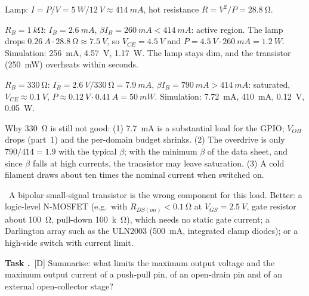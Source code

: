 \documentclass[a4paper,11pt]{article}
\newcounter{task}[section]
\renewcommand{\thetask}{\thesection.\arabic{task}}
\newcommand{\task}[1]{\par\medskip\refstepcounter{task}%
  {\sffamily\bfseries\color{rwuviolet}Task \thetask}\ {\sffamily\small\color{rwucyandark}[#1]}\quad}
\newenvironment{solution}{\begin{solbox}}{\end{solbox}}
\newcommand{\answer}{\par\smallskip{\sffamily\bfseries\color{rwuviolet}Answer:}\ }
\begin{document}
\begin{solution}
\begin{steps}
  \item Lamp: $I=P/V=\SI{5}{W}/\SI{12}{V}\approx\SI{414}{mA}$, hot resistance $R=V^2/P=\SI{28.8}{\ohm}$.
  \item $R_B=\SI{1}{k\ohm}$: $I_B=\SI{2.6}{mA}$, $\beta I_B=\SI{260}{mA}<\SI{414}{mA}$: active region. The lamp
        drops $\SI{0.26}{A}\cdot\SI{28.8}{\ohm}\approx\SI{7.5}{V}$, so $V_{CE}=\SI{4.5}{V}$ and
        $P=\SI{4.5}{V}\cdot\SI{260}{mA}=\SI{1.2}{W}$. Simulation: \SI{256}{mA}, \SI{4.57}{V}, \SI{1.17}{W}.
        The lamp stays dim, and the transistor (\SI{250}{mW}) overheats within seconds.
  \item $R_B=\SI{330}{\ohm}$: $I_B=\SI{2.6}{V}/\SI{330}{\ohm}=\SI{7.9}{mA}$, $\beta I_B=\SI{790}{mA}>\SI{414}{mA}$:
        saturated, $V_{CE}\approx\SI{0.1}{V}$, $P\approx\SI{0.12}{V}\cdot\SI{0.41}{A}=\SI{50}{mW}$. Simulation:
        \SI{7.72}{mA}, \SI{410}{mA}, \SI{0.12}{V}, \SI{0.05}{W}.
  \item Why \SI{330}{\ohm} is still not good: (1) \SI{7.7}{mA} is a substantial load for the GPIO; $V_{OH}$ drops
        (part~1) and the per-domain budget shrinks. (2) The overdrive is only $790/414=1.9$ with the typical
        $\beta$; with the minimum $\beta$ of the data sheet, and since $\beta$ falls at high currents, the
        transistor may leave saturation. (3) A cold filament draws about ten times the nominal current when
        switched on.
\end{steps}
\answer A bipolar small-signal transistor is the wrong component for this load. Better: a logic-level N-MOSFET
(e.g.\ with $R_{DS(on)}<\SI{0.1}{\ohm}$ at $V_{GS}=\SI{2.5}{V}$, gate resistor about \SI{100}{\ohm}, pull-down
\SI{100}{k\ohm}), which needs no static gate current; a Darlington array such as the ULN2003 (\SI{500}{mA},
integrated clamp diodes); or a high-side switch with current limit.
\end{solution}

\task{D} Summarise: what limits the maximum output voltage and the maximum output current of a push-pull pin, of
an open-drain pin and of an external open-collector stage?
\end{document}
